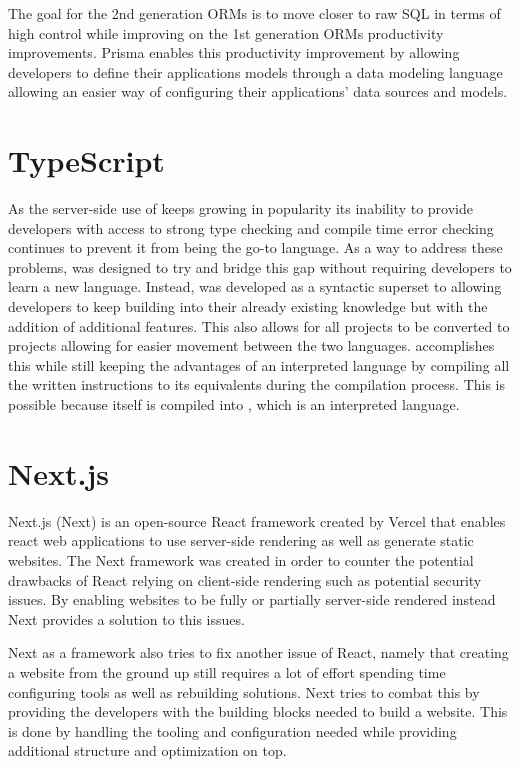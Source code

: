 The goal for the 2nd generation ORMs is to move closer to raw SQL in terms of high control while improving on the 1st generation ORMs productivity improvements. 
Prisma enables this productivity improvement by allowing developers to define their applications models through a data modeling language allowing an easier way of configuring their applications' data sources and models\cite{Prisma_Doc}.

\section*{TypeScript}
As the server-side use of \javascript{} keeps growing in popularity its inability to provide developers with access to strong type checking and compile time error checking continues to prevent it from being the go-to language.
As a way to address these problems, \typescript{} was designed to try and bridge this gap without requiring developers to learn a new language.
Instead, \typescript{} was developed as a syntactic superset to \javascript{} allowing developers to keep building into their already existing knowledge but with the addition of additional features. 
This also allows for all \javascript{} projects to be converted to \typescript{} projects allowing for easier movement between the two languages\cite{TypeScript}. 
\typescript{} accomplishes this while still keeping the advantages of an interpreted language by compiling all the written instructions to its \javascript{} equivalents during the compilation process. 
This is possible because \typescript{} itself is compiled into \javascript{}, which is an interpreted language. 

\section*{Next.js}
Next.js (Next) is an open-source React framework created by Vercel that enables react web applications to use server-side rendering as well as generate static websites. The Next framework was created in order to counter the potential drawbacks of React relying on client-side rendering such as potential security issues. By enabling websites to be fully or partially server-side rendered instead Next provides a solution to this issues\cite {Nextjs_Docks}. 

Next as a framework also tries to fix another issue of React, namely that creating a website from the ground up still requires a lot of effort spending time configuring tools as well as rebuilding solutions. 
Next tries to combat this by providing the developers with the building blocks needed to build a website.
This is done by handling the tooling and configuration needed while providing additional structure and optimization on top\cite{Nextjs_Docks}.



